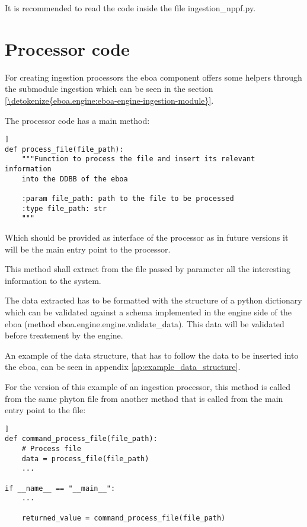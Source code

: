 It is recommended to read the code inside the file ingestion\_nppf.py.

\section{Processor code}

For creating ingestion processors the \acrshort{eboa} component offers some helpers through the submodule ingestion which can be seen in the section \ref{\detokenize{eboa.engine:eboa-engine-ingestion-module}}.

The processor code has a main method:

\begin{lstlisting}[breaklines=true, style=python]]
def process_file(file_path):
    """Function to process the file and insert its relevant information
    into the DDBB of the eboa

    :param file_path: path to the file to be processed
    :type file_path: str
    """
\end{lstlisting}

Which should be provided as interface of the processor as in future versions it will be the main entry point to the processor.

This method shall extract from the file passed by parameter all the interesting information to the system.

The data extracted has to be formatted with the structure of a python dictionary which can be validated against a schema implemented in the engine side of the \acrshort{eboa} (method eboa.engine.engine.validate\_data). This data will be validated before treatement by the engine.

An example of the data structure, that has to follow the data to be inserted into the \acrshort{eboa}, can be seen in appendix \ref{ap:example_data_structure}.

For the version of this example of an ingestion processor, this method is called from the same phyton file from another method that is called from the main entry point to the file:

\begin{lstlisting}[breaklines=true, style=python]]
def command_process_file(file_path):
    # Process file
    data = process_file(file_path)
    ...

if __name__ == "__main__":
    ...

    returned_value = command_process_file(file_path)
\end{lstlisting}

